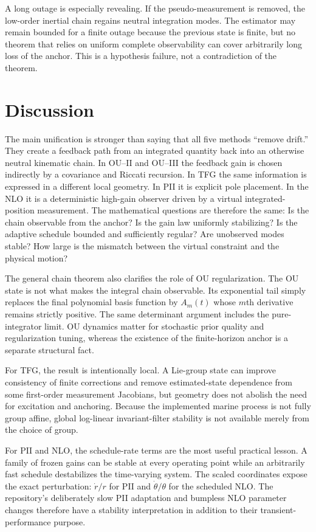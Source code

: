\documentclass[conference]{IEEEtran}
\theoremstyle{remark}
\begin{document}
A long outage is especially revealing.  If the pseudo-measurement is removed,
the low-order inertial chain regains neutral integration modes.  The estimator
may remain bounded for a finite outage because the previous state is finite,
but no theorem that relies on uniform complete observability can cover
arbitrarily long loss of the anchor.  This is a hypothesis failure, not a
contradiction of the theorem.

\section{Discussion}

The main unification is stronger than saying that all five methods ``remove
drift.''  They create a feedback path from an integrated quantity back into an
otherwise neutral kinematic chain.  In OU--II and OU--III the feedback gain is
chosen indirectly by a covariance and Riccati recursion.  In TFG the same
information is expressed in a different local geometry.  In PII it is explicit
pole placement.  In the NLO it is a deterministic high-gain observer driven by
a virtual integrated-position measurement.  The mathematical questions are
therefore the same: Is the chain observable from the anchor?  Is the gain law
uniformly stabilizing?  Is the adaptive schedule bounded and sufficiently
regular?  Are unobserved modes stable?  How large is the mismatch between the
virtual constraint and the physical motion?

The general chain theorem also clarifies the role of OU regularization.  The OU
state is not what makes the integral chain observable.  Its exponential tail
simply replaces the final polynomial basis function by $A_m(t)$ whose $m$th
derivative remains strictly positive.  The same determinant argument includes
the pure-integrator limit.  OU dynamics matter for stochastic prior quality and
regularization tuning, whereas the existence of the finite-horizon anchor is a
separate structural fact.

For TFG, the result is intentionally local.  A Lie-group state can improve
consistency of finite corrections and remove estimated-state dependence from
some first-order measurement Jacobians, but geometry does not abolish the need
for excitation and anchoring.  Because the implemented marine process is not
fully group affine, global log-linear invariant-filter stability is not
available merely from the choice of group.

For PII and NLO, the schedule-rate terms are the most useful practical lesson.
A family of frozen gains can be stable at every operating point while an
arbitrarily fast schedule destabilizes the time-varying system.  The scaled
coordinates expose the exact perturbation: $\dot r/r$ for PII and
$\dot\theta/\theta$ for the scheduled NLO.  The repository's deliberately slow
PII adaptation and bumpless NLO parameter changes therefore have a stability
interpretation in addition to their transient-performance purpose.
\end{document}
